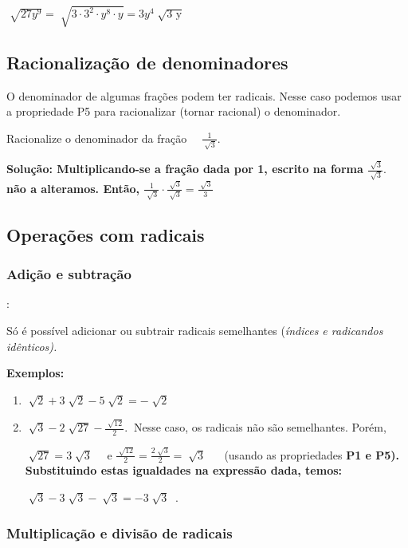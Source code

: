 \quad  \( \sqrt[]{27y^{9}}=\sqrt[]{3  \cdot 3^{2} \cdot y^{8} \cdot y}=3y^{4}\sqrt[]{\text{3 y}} \) ~ \qedsymbol{}

\subsection{Racionalização de denominadores}

O denominador de algumas frações podem ter radicais. Nesse caso podemos usar a propriedade P5 para racionalizar (tornar racional) o denominador. 

\begin{texemplo}
	
Racionalize o denominador da fração~~   \( \frac{1}{\sqrt[]{3}}. \)

\textbf{Solução: Multiplicando-se a fração dada por 1, escrito na forma  \( \frac{\sqrt[]{3}}{\sqrt[]{3}}. \) ~~ não a alteramos. Então,  \( \frac{1}{\sqrt[]{3}} \cdot \frac{\sqrt[]{3}}{\sqrt[]{3}}=\frac{\sqrt[]{3}}{3} \) ~ \qedsymbol{}}
\end{texemplo}
\subsection{Operações com radicais}

\subsubsection{Adição e subtração}:

Só é possível adicionar ou subtrair radicais semelhantes (\textit{índices e radicandos idênticos). }

\textbf{Exemplos:}

\begin{enumerate}
	\item  \( \sqrt[]{2}+3\sqrt[]{2}-5\sqrt[]{2}=-\sqrt[]{2} \) 

	\item  \( \sqrt[]{3}-2\sqrt[]{27}-\frac{\sqrt[]{12}}{2}.~ \)  Nesse caso, os radicais não são semelhantes. Porém,

 \( \sqrt[]{27}=3\sqrt[]{3} \) ~~e   \( \frac{\sqrt[]{12}}{2}=\frac{2\sqrt[]{3}}{2}=\sqrt[]{3} \) ~~ (usando as propriedades \textbf{P1 e P5). Substituindo estas igualdades na expressão dada, temos:}

 \( \sqrt[]{3}-3\sqrt[]{3}-\sqrt[]{3}=-3\sqrt[]{3}~ \) .
\end{enumerate}
	\subsubsection{Multiplicação e divisão de radicais}


